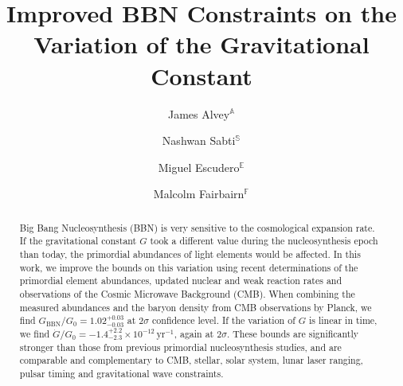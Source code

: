 \documentclass[notitlepage,twocolumn,letterpaper,natbib,aps,prl,amsmath,amsfonts,nofootinbib,preprintnumbers,superscriptaddress,secnumarabic,groupedaddress]{revtex4-1}
\begin{document}
\title{Improved BBN Constraints on the Variation of the Gravitational Constant}


\author{James Alvey$^\mathds{A}$}

\author{Nashwan Sabti$^\mathds{S}$}

\author{Miguel Escudero$^\mathds{E}$}

\author{Malcolm Fairbairn$^\mathds{F}$}





\def\thefootnote{$\mathds{A}$\hspace{-0.5pt}}
\def\thefootnote{$\mathds{S}$\hspace{0.4pt}}
\def\thefootnote{$\mathds{E}$}
\def\thefootnote{$\mathds{F}$}
\setcounter{footnote}{0}
\def\thefootnote{\arabic{footnote}}
\begin{abstract}
\noindent Big Bang Nucleosynthesis (BBN) is very sensitive to the cosmological expansion rate. If the gravitational constant $G$ took a different value during the nucleosynthesis epoch than today, the primordial abundances of light elements would be affected. In this work, we improve the bounds on this variation using recent determinations of the primordial element abundances, updated nuclear and weak reaction rates and observations of the Cosmic Microwave Background (CMB). When combining the measured abundances and the baryon density from CMB observations by Planck, we find $G_\mathrm{BBN}/G_0 = 1.02^{+0.03}_{-0.03}$ at $2\sigma$ confidence level. If the variation of $G$ is linear in time, we find $\dot{G}/G_0 = -1.4^{+2.2}_{-2.3}\times 10^{-12} \, \mathrm{yr}^{-1}$, again at $2\sigma$. These bounds are significantly stronger than those from previous primordial nucleosynthesis studies, and are comparable and complementary to CMB, stellar, solar system, lunar laser ranging, pulsar timing and gravitational wave constraints.
\end{abstract}
\end{document}
